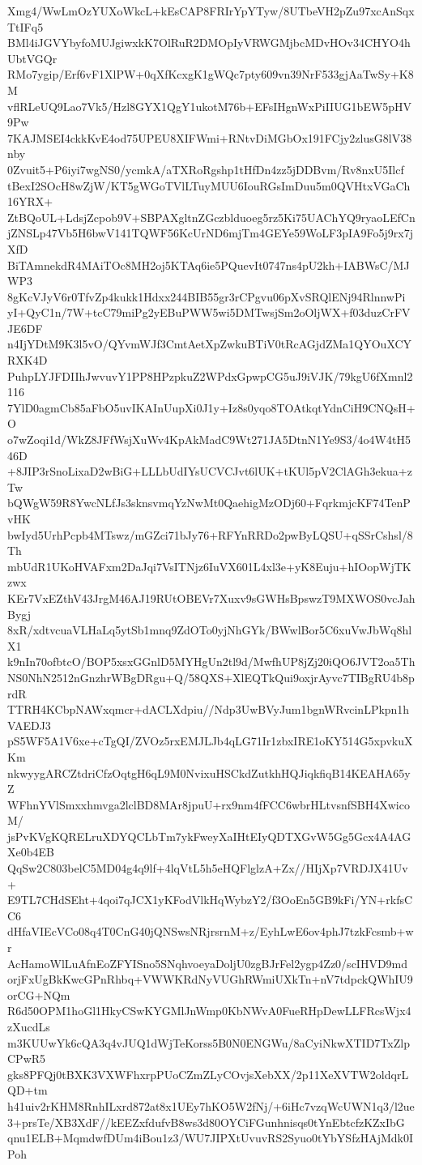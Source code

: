 Xmg4/WwLmOzYUXoWkcL+kEsCAP8FRIrYpYTyw/8UTbeVH2pZu97xcAnSqxTtIFq5
BMl4iJGVYbyfoMUJgiwxkK7OlRuR2DMOpIyVRWGMjbcMDvHOv34CHYO4hUbtVGQr
RMo7ygip/Erf6vF1XlPW+0qXfKcxgK1gWQc7pty609vn39NrF533gjAaTwSy+K8M
vflRLeUQ9Lao7Vk5/Hzl8GYX1QgY1ukotM76b+EFsIHgnWxPiIIUG1bEW5pHV9Pw
7KAJMSEI4ckkKvE4od75UPEU8XIFWmi+RNtvDiMGbOx191FCjy2zlusG8lV38nby
0Zvuit5+P6iyi7wgNS0/ycmkA/aTXRoRgshp1tHfDn4zz5jDDBvm/Rv8nxU5Ilcf
tBexI2SOcH8wZjW/KT5gWGoTVlLTuyMUU6IouRGsImDuu5m0QVHtxVGaCh16YRX+
ZtBQoUL+LdsjZcpob9V+SBPAXgltnZGczblduoeg5rz5Ki75UAChYQ9ryaoLEfCn
jZNSLp47Vb5H6bwV141TQWF56KcUrND6mjTm4GEYe59WoLF3pIA9Fo5j9rx7jXfD
BiTAmnekdR4MAiTOc8MH2oj5KTAq6ie5PQuevIt0747ns4pU2kh+IABWsC/MJWP3
8gKcVJyV6r0TfvZp4kukk1Hdxx244BIB55gr3rCPgvu06pXvSRQlENj94RlnnwPi
yI+QyC1n/7W+tcC79miPg2yEBuPWW5wi5DMTwsjSm2oOljWX+f03duzCrFVJE6DF
n4IjYDtM9K3l5vO/QYvmWJf3CmtAetXpZwkuBTiV0tRcAGjdZMa1QYOuXCYRXK4D
PuhpLYJFDIIhJwvuvY1PP8HPzpkuZ2WPdxGpwpCG5uJ9iVJK/79kgU6fXmnl2116
7YlD0agmCb85aFbO5uvIKAInUupXi0J1y+Iz8s0yqo8TOAtkqtYdnCiH9CNQsH+O
o7wZoqi1d/WkZ8JFfWsjXuWv4KpAkMadC9Wt271JA5DtnN1Ye9S3/4o4W4tH546D
+8JIP3rSnoLixaD2wBiG+LLLbUdIYsUCVCJvt6lUK+tKUl5pV2ClAGh3ekua+zTw
bQWgW59R8YwcNLfJs3sknsvmqYzNwMt0QaehigMzODj60+FqrkmjcKF74TenPvHK
bwIyd5UrhPcpb4MTswz/mGZci71bJy76+RFYnRRDo2pwByLQSU+qSSrCshsl/8Th
mbUdR1UKoHVAFxm2DaJqi7VsITNjz6IuVX601L4xl3e+yK8Euju+hIOopWjTKzwx
KEr7VxEZthV43JrgM46AJ19RUtOBEVr7Xuxv9sGWHsBpswzT9MXWOS0vcJahBygj
8xR/xdtvcuaVLHaLq5ytSb1mnq9ZdOTo0yjNhGYk/BWwlBor5C6xuVwJbWq8hlX1
k9nIn70ofbtcO/BOP5xsxGGnlD5MYHgUn2tl9d/MwfhUP8jZj20iQO6JVT2oa5Th
NS0NhN2512nGnzhrWBgDRgu+Q/58QXS+XlEQTkQui9oxjrAyvc7TIBgRU4b8prdR
TTRH4KCbpNAWxqmcr+dACLXdpiu//Ndp3UwBVyJum1bgnWRvcinLPkpn1hVAEDJ3
pS5WF5A1V6xe+cTgQI/ZVOz5rxEMJLJb4qLG71Ir1zbxIRE1oKY514G5xpvkuXKm
nkwyygARCZtdriCfzOqtgH6qL9M0NvixuHSCkdZutkhHQJiqkfiqB14KEAHA65yZ
WFhnYVlSmxxhmvga2lclBD8MAr8jpuU+rx9nm4fFCC6wbrHLtvsnfSBH4XwicoM/
jsPvKVgKQRELruXDYQCLbTm7ykFweyXaIHtEIyQDTXGvW5Gg5Gcx4A4AGXe0b4EB
QqSw2C803belC5MD04g4q9lf+4lqVtL5h5eHQFlglzA+Zx//HIjXp7VRDJX41Uv+
E9TL7CHdSEht+4qoi7qJCX1yKFodVlkHqWybzY2/f3OoEn5GB9kFi/YN+rkfsCC6
dHfaVIEcVCo08q4T0CnG40jQNSwsNRjrsrnM+z/EyhLwE6ov4phJ7tzkFcsmb+wr
AcHamoWlLuAfnEoZFYISno5SNqhvoeyaDoljU0zgBJrFel2ygp4Zz0/scIHVD9md
orjFxUgBkKwcGPnRhbq+VWWKRdNyVUGhRWmiUXkTn+nV7tdpckQWhIU9orCG+NQm
R6d50OPM1hoGl1HkyCSwKYGMlJnWmp0KbNWvA0FueRHpDewLLFRcsWjx4zXucdLs
m3KUUwYk6cQA3q4vJUQ1dWjTeKorss5B0N0ENGWu/8aCyiNkwXTID7TxZlpCPwR5
gks8PFQj0tBXK3VXWFhxrpPUoCZmZLyCOvjsXebXX/2p11XeXVTW2oldqrLQD+tm
h41uiv2rKHM8RnhILxrd872at8x1UEy7hKO5W2fNj/+6iHc7vzqWcUWN1q3/l2ue
3+prsTe/XB3XdF//kEEZxfdufvB8ws3d80OYCiFGunhnisqs0tYnEbtcfzKZxIbG
qnu1ELB+MqmdwfDUm4iBou1z3/WU7JIPXtUvuvRS2Syuo0tYbYSfzHAjMdk0IPoh
